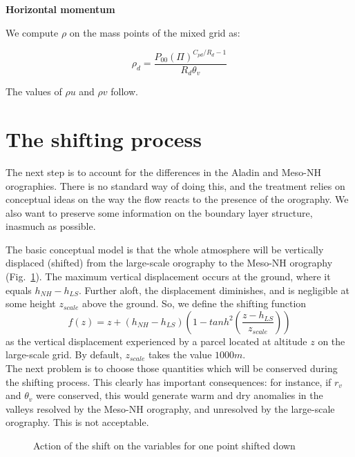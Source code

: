 {\bf Horizontal momentum}

We compute $\rho$ on the mass points of the mixed grid as:

\begin{equation}
\label{eq:rhod}
{\rho_d}=\frac{P_{00}(\Pi)^{C_{pd}/R_d -1}}
{R_d\theta_v}
\end{equation}

The values of $\rho u$ and $\rho v$ follow.

\section{The shifting process}

The next step is to account for the differences in the Aladin and Meso-NH
orographies. There is no standard way of doing this, and the treatment
relies on conceptual ideas on the way the flow reacts to the presence of
the orography. We also want to preserve some information on the boundary
layer structure, inasmuch as possible.

The basic conceptual model is that the whole atmosphere will be vertically
displaced (shifted) from the large-scale orography to the Meso-NH orography
(Fig.~\ref{physhift}). The maximum vertical
displacement occurs at the ground, where it equals $h_{NH}-h_{LS}$. Further
aloft, the displacement diminishes, and is negligible at some height
$z_{scale}$ above the ground. So, we define the shifting function
\begin{equation}
\label{shift}
f(z)=z+(h_{NH}-h_{LS})\left( 1-\textstyle{tanh}^2
\left(\frac{z-h_{LS}}{z_{scale}}\right)\right)
\end{equation}
as the vertical displacement experienced by a parcel located at altitude
$z$ on the large-scale grid.
By default, $z_{scale}$ takes the value $1000m$.\\

The next problem is to choose those quantities which will be conserved
during the shifting process. This clearly has important consequences: for
instance, if $r_v$ and $\theta_v$ were conserved, this would generate
warm and dry anomalies in the valleys resolved by the Meso-NH orography,
and unresolved by the large-scale orography. This is not acceptable.

\clearpage

\begin{figure}[htb]
\hspace*{-0.5cm}
\caption{Action of the shift on the variables for one point shifted down
\label{physhift}}
\end{figure}


